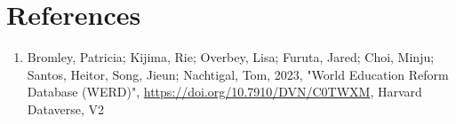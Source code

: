 \documentclass{article}
\begin{document}
\section*{References}
\begin{enumerate}
    \item Bromley, Patricia; Kijima, Rie; Overbey, Lisa; Furuta, Jared; Choi, Minju; Santos, Heitor, Song, Jieun; Nachtigal, Tom, 2023, "World Education Reform Database (WERD)", \url{https://doi.org/10.7910/DVN/C0TWXM}, Harvard Dataverse, V2
\end{enumerate}
\end{document}
